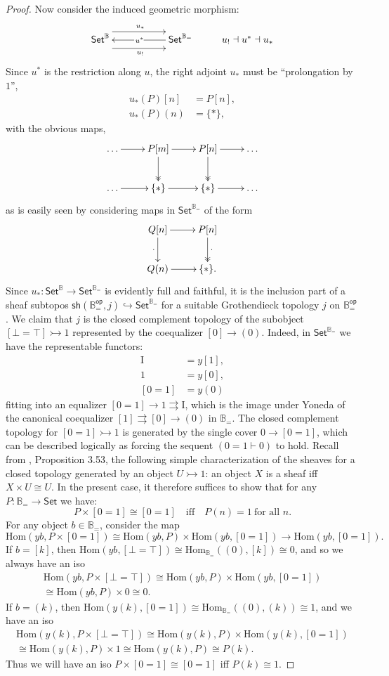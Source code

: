 \documentclass[11pt]{amsart}
\newcommand{\B}{\ensuremath{\mathbb{B}}}
\newcommand{\Set}{\ensuremath{\mathsf{Set}}}
\newcommand{\hook}{\ensuremath{\hookrightarrow}}
\newcommand{\mono}{\ensuremath{\rightarrowtail}}
\renewcommand{\to}{\ensuremath{\rightarrow}}
\renewcommand{\hom}{\ensuremath{\mathrm{Hom}}}
\newcommand{\I}{\ensuremath{\mathrm{I}}}
\theoremstyle{remark}
\theoremstyle{definition}
\begin{document}
\begin{proof}
Now consider the induced geometric morphism:
\[
\xymatrix{
\Set^\B \ar@<-2ex>[rr]_{u_!} \ar@<2ex>[rr]^{u_*} && \ar[ll]|-{\,u^*} \Set^{\B_=}  & u_! \dashv u^* \dashv u_*
}
\]
Since $u^*$ is the restriction along $u$, the right adjoint $u_*$ must be ``prolongation by $1$'',
\begin{align*}
u_*(P)[n] &= P[n],\\
u_*(P)(n) &= \{*\},
\end{align*}
with the obvious maps,
\[
\xymatrix{
\dots \ar[r] & P[m] \ar@{->>}[d] \ar[r] & P[n] \ar@{->>}[d] \ar[r] & \dots \\
\dots \ar[r] & \{*\} \ar[r] & \{*\} \ar[r] & \dots
}
\]
as is easily seen by considering maps in $\Set^{\B_=}$ of the form
\[
\xymatrix{
 Q[n] \ar[d]_{\cdot} \ar[r] & P[n] \ar@{->>}[d]^{\cdot} \\
 Q(n) \ar[r]^{} & \{*\} .
}
\]
Since $u_* : \Set^{\B} \to \Set^{\B_=}$ is evidently full and faithful, it is the inclusion part of a sheaf subtopos $\mathsf{sh}(\B^\mathsf{op}_=, j) \hook \Set^{\B_=}$ for a suitable Grothendieck topology $j$ on $\B^\mathsf{op}_=$.  We claim that $j$ is the closed complement topology of the subobject $[\bot=\top] \rightarrowtail 1$ represented by the coequalizer $[0]\to (0)$.  Indeed, in $\Set^{\B_=}$ we have the representable functors:
\begin{align*}
\I &= y[1],\\
1 &= y[0],\\
[0=1] &= y(0)
\end{align*}
fitting into an equalizer $[0=1] \to 1 \rightrightarrows \I$, which is the image under Yoneda of the canonical coequalizer $[1] \rightrightarrows [0]\to (0)$ in $\B_=$.  The closed complement topology for $[0=1] \mono 1$ is generated by the single cover $0\to [0=1]$, which can be described logically as 
forcing the sequent $(0=1 \vdash 0)$ to hold.  Recall from \cite{JohnstoneTT}, Proposition 3.53, the following simple characterization of the sheaves for a closed topology generated by an object $U\mono 1$: an object $X$ is a sheaf iff $X\times U \cong U$. In the present case, it therefore suffices to show that for any $P:\B_= \to \Set$ we have:
\[
P\times [0=1] \cong [0=1] \quad\text{iff}\quad P(n) = 1\ \text{for all $n$}.
\]
For any object $b\in \B_=$, consider the map
\[
\hom(yb, P\times [0=1] ) \cong \hom(yb, P) \times \hom(yb, [0=1]) \to \hom(yb, [0=1]) .
\]
If $b = [k]$, then $\hom(yb, [\bot=\top]) \cong \hom_{\B_=}((0), [k]) \cong 0$, and so we always have an iso
\[
\begin{split}
\hom(yb, P\times [\bot=\top] ) \cong \hom(yb, P) \times \hom(yb, [0=1])\\
 \cong \hom(yb, P) \times 0 \cong 0.
 \end{split}
\]
If $b = (k)$, then $\hom(y(k), [0=1]) \cong \hom_{\B_=}((0), (k)) \cong 1$, and we have an iso
\[
\begin{split}
\hom(y(k), P\times [\bot=\top] ) \cong \hom(y(k), P) \times \hom(y(k), [0=1]) \\
\cong \hom(y(k), P) \times 1 \cong \hom(y(k), P) \cong P(k).
\end{split}
\]
Thus we will have an iso $P\times [0=1] \cong [0=1]$ iff $P(k) \cong 1$.


\end{proof}
\end{document}
